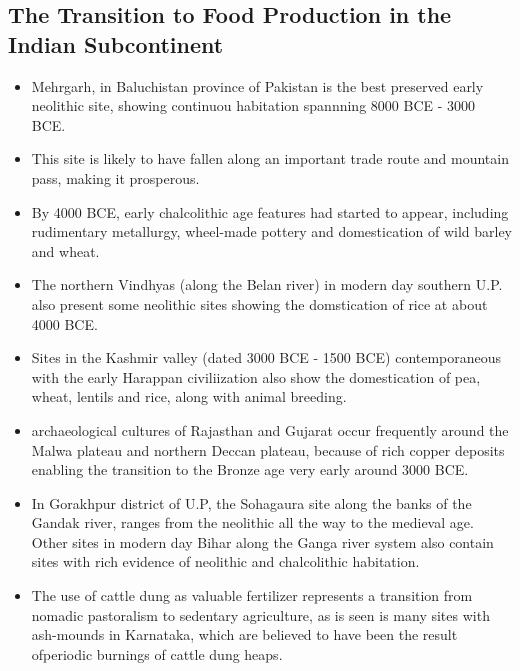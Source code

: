\subsection{The Transition to Food Production in the Indian Subcontinent}
\begin{itemize}
    \item Mehrgarh, in Baluchistan province of Pakistan is the best preserved early neolithic site, showing continuou habitation spannning 8000 BCE - 3000 BCE.
    \item This site is likely to have fallen along an important trade route and mountain pass, making it prosperous.
    \item By 4000 BCE, early \gls{chalcolithic age} features had started to appear, including rudimentary metallurgy, wheel-made pottery and domestication of wild barley and wheat.
    \item The northern Vindhyas (along the Belan river) in modern day southern U.P. also present some neolithic sites showing the domstication of rice at about 4000 BCE.
    \item Sites in the Kashmir valley (dated 3000 BCE - 1500 BCE) contemporaneous with the early Harappan civiliization also show the domestication of pea, wheat, lentils and rice, along with animal breeding.
    \item \Glspl{archaeological culture} of Rajasthan and Gujarat occur frequently around the Malwa plateau and northern Deccan plateau, because of rich copper deposits enabling the transition to the Bronze age very early around 3000 BCE.
    \item In Gorakhpur district of U.P, the Sohagaura site along the banks of the Gandak river, ranges from the neolithic all the way to the medieval age. Other sites in modern day Bihar along the Ganga river system also contain sites with rich evidence of neolithic and chalcolithic habitation.
    \item The use of cattle dung as valuable fertilizer represents a transition from nomadic
          pastoralism to sedentary agriculture, as is seen is many sites with ash-mounds in Karnataka, which are believed to have been the result ofperiodic burnings of cattle dung heaps.
\end{itemize}

